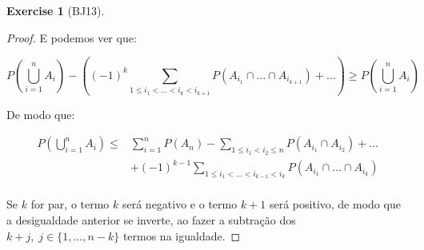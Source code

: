 \documentclass[
]{article}
\theoremstyle{definition}
\theoremstyle{definition}
\theoremstyle{definition}
\newtheorem{exercise}{Exercise}[section]
\theoremstyle{definition}
\theoremstyle{remark}
\begin{document}
\begin{exercise}[BJ13]
\begin{proof}
E podemos ver que:

\begin{equation*}
P\left(\bigcup_{i=1}^{n} A_{i}\right) - \left((-1)^{k} \sum_{1 \le i_{1} < \dots < i_{k} < i_{k+1}}P(A_{i_{1}} \cap \dots \cap A_{i_{k+1}}) + \dots \right) \ge P\left(\bigcup_{i=1}^{n} A_{i}\right)
\end{equation*}

De modo que:

\begin{align*}
P\left(\bigcup_{i=1}^{n} A_{i}\right) \le &\sum_{i=1}^{n}P(A_{n}) - \sum_{1 \le i_{1} < i_{2} \le n}P(A_{i_{1}} \cap A_{i_{2}}) + \dots \\
&+ (-1)^{k-1} \sum_{1 \le i_{1} < \dots < i_{k-1} < i_{k}}P(A_{i_{1}} \cap \dots \cap A_{i_{k}}) \\
\end{align*}

Se \(k\) for par, o termo \(k\) será negativo e o termo \(k+1\) será positivo, de modo que a desigualdade anterior se inverte, ao fazer a subtração dos \(k+j,\; j \in \{1,\dots , n-k\}\) termos na igualdade.
\end{proof}

\end{exercise}
\end{document}
